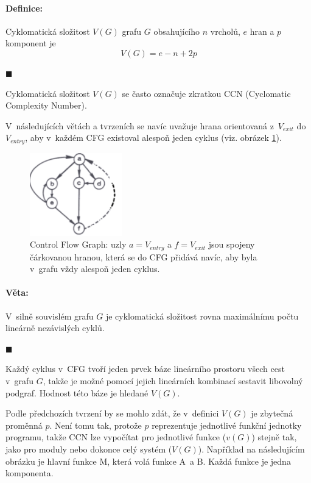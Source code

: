 \documentclass[11pt,twoside,a4paper]{book}
\begin{document}
\paragraph{Definice:}\cite{CCN} Cyklomatická složitost $V(G)$ grafu $G$ obsahujícího $n$ vrcholů, $e$ hran a $p$ komponent je
$$V(G) = e - n + 2p$$
\begin{flushright}$\blacksquare$\end{flushright}

Cyklomatická složitost $V(G)$ se často označuje zkratkou CCN (Cyclomatic Complexity Number).

V~následujících větách a tvrzeních se navíc uvažuje hrana orientovaná z~$V_{exit}$ do $V_{entry}$, aby v~každém CFG existoval alespoň jeden cyklus
(viz. obrázek \ref{fig:ccn_vcg}).

\begin{figure}[H]
\begin{center}
\includegraphics[width=4cm]{figures/ccn_cfg.pdf}
\caption{Control Flow Graph: uzly $a = V_{entry}$ a $f = V_{exit}$ jsou spojeny čárkovanou hranou, která se do CFG přidává navíc, aby byla v~grafu vždy alespoň jeden cyklus.}
\label{fig:ccn_vcg}
\end{center}
\end{figure}

\paragraph{Věta:} V~silně souvislém grafu $G$ je cyklomatická složitost rovna maximálnímu počtu \mbox{lineárně} nezávislých cyklů.
\begin{flushright}$\blacksquare$\end{flushright}

Každý cyklus v~CFG tvoří jeden prvek báze lineárního prostoru všech cest v~grafu $G$, takže je možné pomocí jejich lineárních
kombinací sestavit libovolný podgraf. Hodnost této báze je hledané $V(G)$.

Podle předchozích tvrzení by se mohlo zdát, že v~definici $V(G)$ je zbytečná proměnná $p$. Není tomu tak, protože $p$ reprezentuje
jednotlivé funkční jednotky programu, takže CCN lze vypočítat pro jednotlivé funkce ($v(G)$) stejně tak, jako pro moduly nebo dokonce celý systém ($V(G)$).
Například na následujícím obrázku je hlavní funkce M, která volá funkce A~a B. Každá funkce je jedna komponenta.
\end{document}
